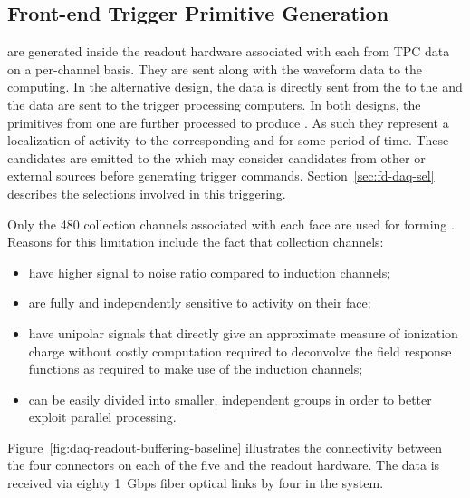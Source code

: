 
\subsection{Front-end Trigger Primitive Generation}
\label{sec:fd-daq-fetp}


 are generated inside the  readout
hardware associated with each  from TPC data on a per-channel basis.
They are sent along with the waveform data to the  
computing.
In the alternative design, the data is directly sent from the  to
the  and the data are sent to the trigger processing
computers.  
In both designs, the primitives from one  are further
processed to produce . 
As such they represent a localization of activity to the corresponding
 and for some period of time. 
These candidates are emitted to the  which may consider
candidates from other  or external sources before
generating trigger commands.
Section~\ref{sec:fd-daq-sel} describes the selections involved in this
triggering.

Only the \num{480} collection channels associated with each  face are
used for forming . 
Reasons for this limitation include the fact that collection
channels:

\begin{itemize}
\item have higher signal to noise ratio compared to induction channels;
\item are fully and independently sensitive to activity on their  face;
\item have unipolar signals that directly give an approximate measure
  of ionization charge without costly computation required to
  deconvolve the field response functions as required to make use of
  the induction channels;
\item can be easily divided into smaller, independent groups in order
  to better exploit parallel processing.
\end{itemize}


Figure~\ref{fig:daq-readout-buffering-baseline} illustrates the connectivity between the
four connectors on each of the five  and the  readout hardware.
The data is received via eighty \SI{1}{Gbps} fiber optical links by four 
in the   system. 

